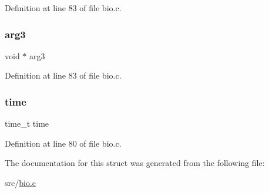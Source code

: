 Definition at line 83 of file bio.\+c.

\mbox{\label{structbio__job_a3fe71d88fd8b45ddfbdf347c3c69b485}} 
\subsubsection{\texorpdfstring{arg3}{arg3}}
{\footnotesize\ttfamily void $\ast$ arg3}



Definition at line 83 of file bio.\+c.

\mbox{\label{structbio__job_ab842bdb7d02be824fb48613032b4ff36}} 
\subsubsection{\texorpdfstring{time}{time}}
{\footnotesize\ttfamily time\+\_\+t time}



Definition at line 80 of file bio.\+c.



The documentation for this struct was generated from the following file\+:\begin{DoxyCompactItemize}
\item 
src/\hyperlink{bio_8c}{bio.\+c}\end{DoxyCompactItemize}
